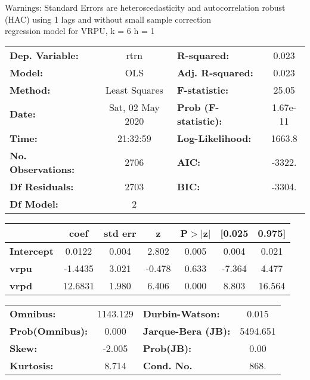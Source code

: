 Warnings: \newline
 [1] Standard Errors are heteroscedasticity and autocorrelation robust (HAC) using 1 lags and without small sample correction\\ 

regression model for VRPU, k = 6 h = 1\begin{center}
\begin{tabular}{lclc}
\toprule
\textbf{Dep. Variable:}    &       rtrn       & \textbf{  R-squared:         } &     0.023   \\
\textbf{Model:}            &       OLS        & \textbf{  Adj. R-squared:    } &     0.023   \\
\textbf{Method:}           &  Least Squares   & \textbf{  F-statistic:       } &     25.05   \\
\textbf{Date:}             & Sat, 02 May 2020 & \textbf{  Prob (F-statistic):} &  1.67e-11   \\
\textbf{Time:}             &     21:32:59     & \textbf{  Log-Likelihood:    } &    1663.8   \\
\textbf{No. Observations:} &        2706      & \textbf{  AIC:               } &    -3322.   \\
\textbf{Df Residuals:}     &        2703      & \textbf{  BIC:               } &    -3304.   \\
\textbf{Df Model:}         &           2      & \textbf{                     } &             \\
\bottomrule
\end{tabular}
\begin{tabular}{lcccccc}
                   & \textbf{coef} & \textbf{std err} & \textbf{z} & \textbf{P$> |$z$|$} & \textbf{[0.025} & \textbf{0.975]}  \\
\midrule
\textbf{Intercept} &       0.0122  &        0.004     &     2.802  &         0.005        &        0.004    &        0.021     \\
\textbf{vrpu}      &      -1.4435  &        3.021     &    -0.478  &         0.633        &       -7.364    &        4.477     \\
\textbf{vrpd}      &      12.6831  &        1.980     &     6.406  &         0.000        &        8.803    &       16.564     \\
\bottomrule
\end{tabular}
\begin{tabular}{lclc}
\textbf{Omnibus:}       & 1143.129 & \textbf{  Durbin-Watson:     } &    0.015  \\
\textbf{Prob(Omnibus):} &   0.000  & \textbf{  Jarque-Bera (JB):  } & 5494.651  \\
\textbf{Skew:}          &  -2.005  & \textbf{  Prob(JB):          } &     0.00  \\
\textbf{Kurtosis:}      &   8.714  & \textbf{  Cond. No.          } &     868.  \\
\bottomrule
\end{tabular}
\end{center}

